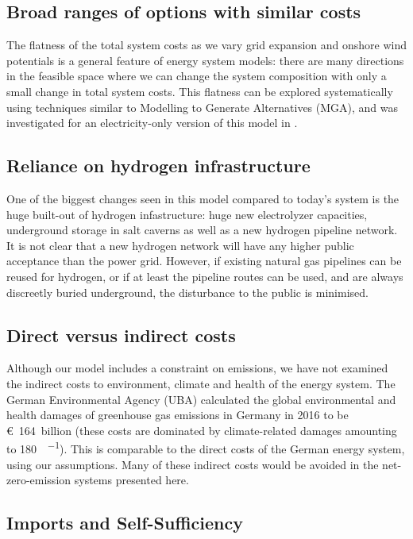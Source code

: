 \subsection*{Broad ranges of options with similar costs}

The flatness of the total system costs as we vary grid expansion and
onshore wind potentials is a general feature of energy system models:
there are many directions in the feasible space where we can change
the system composition with only a small change in total system
costs. This flatness can be explored systematically using techniques similar to Modelling to
Generate Alternatives (MGA), and was investigated for an
electricity-only version of this model in \cite{Neumann2019}.

\subsection*{Reliance on hydrogen infrastructure}

One of the biggest changes seen in this model compared to today's
system is the huge built-out of hydrogen infastructure: huge new
electrolyzer capacities, underground storage in salt caverns as well
as a new hydrogen pipeline network. It is not clear that a new
hydrogen network will have any higher public acceptance than the power
grid. However, if existing natural gas pipelines can be reused for hydrogen,
or if at least the pipeline routes can be used, and are always discreetly buried underground, the disturbance to
the public is minimised.


\subsection*{Direct versus indirect costs}

Although our model includes a constraint on \co emissions, we have
not examined the indirect costs to environment, climate and health of
the energy system. The German Environmental Agency (UBA) calculated
the global environmental and health damages of greenhouse gas
emissions in Germany in 2016 to be \euro~164~billion \cite{UBA2019}
(these costs are dominated by climate-related damages amounting to
\SI{180}{\sieuro\per\tco}). This is comparable to the direct costs of the
German energy system, using our assumptions. Many of these indirect
costs would be avoided in the net-zero-emission systems presented
here.

\subsection*{Imports and Self-Sufficiency}

